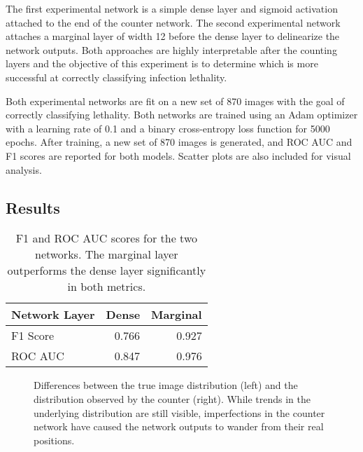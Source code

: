 The first experimental network is a simple dense layer and sigmoid activation attached to the end of the counter network. The second experimental network attaches a marginal layer of width 12 before the dense layer to delinearize the network outputs. Both approaches are highly interpretable after the counting layers and the objective of this experiment is to determine which is more successful at correctly classifying infection lethality. 

Both experimental networks are fit on a new set of 870 images with the goal of correctly classifying lethality. Both networks are trained using an Adam optimizer with a learning rate of 0.1 and a binary cross-entropy loss function for 5000 epochs. After training, a new set of 870 images is generated, and ROC AUC and F1 scores are reported for both models. Scatter plots are also included for visual analysis. 


\subsection{Results}

\begin{table}[h]
    \centering
    \begin{tabular}{lrr}
        \toprule
        Network Layer & Dense & Marginal \\
        \midrule
        F1 Score & 0.766 & 0.927 \\
        ROC AUC  & 0.847 & 0.976 \\
        \bottomrule
    \end{tabular}
\caption{F1 and ROC AUC scores for the two networks. The marginal layer outperforms the dense layer significantly in both metrics.}
\label{table:network}
\end{table}

\begin{figure}
\centering
\begin{subfigure}{.5\textwidth}
  \centering
  
\end{subfigure}%
\begin{subfigure}{.5\textwidth}
  \centering
  
\end{subfigure}
\caption{Differences between the true image distribution (left) and the distribution observed by the counter (right). While trends in the underlying distribution are still visible, imperfections in the counter network have caused the network outputs to wander from their real positions.}
\label{fig:pandemic_counter_comp}
\end{figure}


